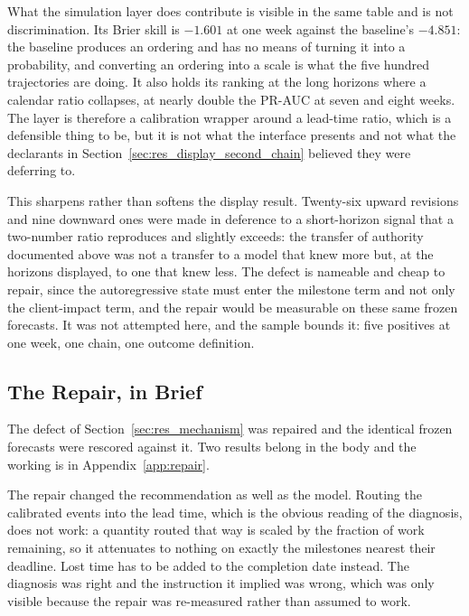 What the simulation layer does contribute is visible in the same table and is not
discrimination. Its Brier skill is $-1.601$ at one week against the baseline's $-4.851$: the
baseline produces an ordering and has no means of turning it into a probability, and converting
an ordering into a scale is what the five hundred trajectories are doing. It also holds its
ranking at the long horizons where a calendar ratio collapses, at nearly double the PR-AUC at
seven and eight weeks. The layer is therefore a calibration wrapper around a lead-time ratio,
which is a defensible thing to be, but it is not what the interface presents and not what the
declarants in Section~\ref{sec:res_display_second_chain} believed they were deferring to.

This sharpens rather than softens the display result. Twenty-six upward revisions and nine
downward ones were made in deference to a short-horizon signal that a two-number ratio
reproduces and slightly exceeds: the transfer of authority documented above was not a transfer
to a model that knew more but, at the horizons displayed, to one that knew less. The defect is
nameable and cheap to repair, since the autoregressive state must enter the milestone term and
not only the client-impact term, and the repair would be measurable on these same frozen
forecasts. It was not attempted here, and the sample bounds it: five positives at one week, one
chain, one outcome definition.

\subsection{The Repair, in Brief}
\label{sec:res_repair}

The defect of Section~\ref{sec:res_mechanism} was repaired and the identical frozen forecasts
were rescored against it. Two results belong in the body and the working is in
Appendix~\ref{app:repair}.

The repair changed the recommendation as well as the model. Routing the calibrated events into
the lead time, which is the obvious reading of the diagnosis, does not work: a quantity routed
that way is scaled by the fraction of work remaining, so it attenuates to nothing on exactly
the milestones nearest their deadline. Lost time has to be added to the completion date
instead. The diagnosis was right and the instruction it implied was wrong, which was only
visible because the repair was re-measured rather than assumed to work.

